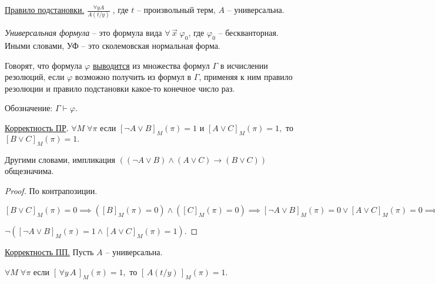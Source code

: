 \documentclass[a4paper, fleqn]{article}
\begin{document}
    \underline{Правило подстановки.} $\boxed{\frac{\forall y A}{A(t/y)}} \; $, где $t$ -- произвольный терм, $A$ -- универсальна.
    
    \textit{Универсальная формула} -- это формула вида $\forall \, \overset{\to}{x} \; \varphi_0$, где $\varphi_0$ -- бескванторная. Иными словами, УФ -- это сколемовская нормальная форма.

    Говорят, что формула $\varphi$ \underline{выводится} из множества  формул $\Gamma$ в исчислении резолюций, если $\varphi$ возможно получить из формул в $\Gamma$, применяя к ним правило резолюции и правило подстановки какое-то конечное число раз.

    Обозначение: $\Gamma \vdash \varphi.$

    \underline{Корректность ПР}. $\forall M \; \forall \pi$ если $[\neg A \lor B]_M (\pi) = 1$  и $[ A \lor C]_M (\pi) = 1,$ то $[B \lor C]_M (\pi) = 1.$

    Другими словами, импликация $( (\neg A \lor B) \land (A \lor C) \to (B \lor C) )$ общезначима.

    \begin{proof} По контрапозиции.

    $[B \lor C]_M (\pi) = 0 \implies \left([B]_M (\pi) = 0\right) \land \left([C]_M (\pi) = 0\right) \implies [\neg A \lor B]_M (\pi) = 0 \lor   [ A \lor C]_M (\pi) = 0 \implies$

    $ \neg([\neg A \lor B]_M (\pi) = 1 \land   [ A \lor C]_M (\pi) = 1).$
    \end{proof}


    \underline{Корректность ПП.} Пусть $A$ -- универсальна.

    $\forall M \; \forall \pi$ если $[ \, \forall y \,  A \, ]_M (\pi) = 1,$  то $[ \, A(t/y) \, ]_M (\pi) = 1.$
\end{document}
